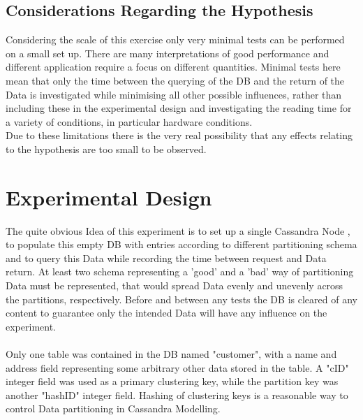 \documentclass{template/csfourzero}
\begin{document}
  \subsection{Considerations Regarding the Hypothesis}
  Considering the scale of this exercise only very minimal tests can be performed on a small set up. There are many interpretations of good performance and different application require a focus on different quantities. \cite{benchmarkIntro,crud} Minimal tests here mean that only the time between the querying of the DB and the return of the Data is investigated while minimising all other possible influences, rather than including these in the experimental design and investigating the reading time for a variety of conditions, in particular hardware conditions.
  \\ Due to these limitations there is the very real possibility that any effects relating to the hypothesis are too small to be observed.

\section{Experimental Design} %
\label{sec:exp}
  The quite obvious Idea of this experiment is to set up a single Cassandra Node \cite{apacheCassandra}, to populate this empty DB with entries according to different partitioning schema and to query this Data while recording the time between request and Data return. At least two schema representing a 'good' and a 'bad' way of partitioning Data must be represented, that would spread Data evenly and unevenly across the partitions, respectively. Before and between any tests the DB is cleared of any content to guarantee only the intended Data will have any influence on the experiment.
  \\
  \\
  Only one table was contained in the DB named "customer", with a name and address field representing some arbitrary other data stored in the table. A "cID" integer field was used as a primary clustering key, while the partition key was another "hashID" integer field. Hashing of clustering keys is a reasonable way to control Data partitioning in Cassandra Modelling. \cite{sherman}
  
\end{document}
